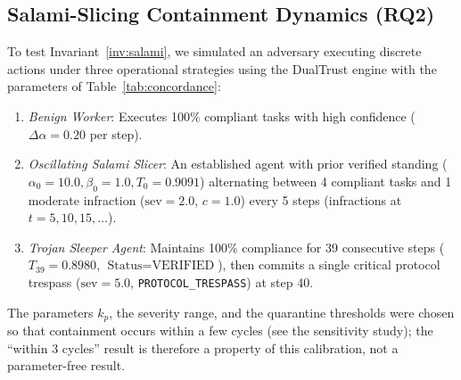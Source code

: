 \documentclass[manuscript, screen, review]{jair}
\begin{document}
\subsection{Salami-Slicing Containment Dynamics (RQ2)}
To test Invariant~\ref{inv:salami}, we simulated an adversary executing discrete actions under three operational strategies using the DualTrust engine with the parameters of Table~\ref{tab:concordance}:
\begin{enumerate}[leftmargin=12pt, topsep=2pt, itemsep=1pt]
\item \emph{Benign Worker}: Executes 100\% compliant tasks with high confidence ($\Delta\alpha = 0.20$ per step).
\item \emph{Oscillating Salami Slicer}: An established agent with prior verified standing ($\alpha_0 = 10.0, \beta_0 = 1.0, T_0 = 0.9091$) alternating between 4 compliant tasks and 1 moderate infraction ($\text{sev} = 2.0$, $c = 1.0$) every 5 steps (infractions at $t = 5, 10, 15, \dots$).
\item \emph{Trojan Sleeper Agent}: Maintains 100\% compliance for 39 consecutive steps ($T_{39} = 0.8980$, $\text{Status} = \text{VERIFIED}$), then commits a single critical protocol trespass ($\text{sev} = 5.0$, \texttt{PROTOCOL\_TRESPASS}) at step 40.
\end{enumerate}
The parameters $k_p$, the severity range, and the quarantine thresholds were chosen so that containment occurs within a few cycles (see the sensitivity study); the ``within 3 cycles'' result is therefore a property of this calibration, not a parameter-free result.
\end{document}

